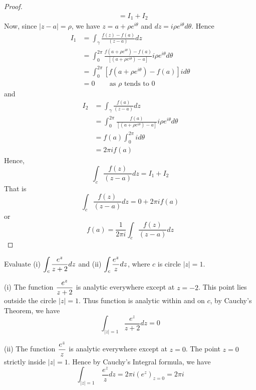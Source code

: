 \begin{proof}
\begin{align*}
																	&= I_1 + I_2
\end{align*}
Now, since $|z-a|=\rho$, we have $z=a+ \rho e^{i\theta}$ and $dz = i \rho e^{i\theta} d\theta$. Hence
\begin{align*}
 I_1 &= \int_{\gamma} \frac{f(z) - f(a)}{(z-a)} dz \\
 	 &= \int_{0}^{2\pi} \frac{f(a+ \rho e^{i\theta}) - f(a)}{[(a+ \rho e^{i\theta})-a]} i \rho e^{i\theta} d\theta \\
 	 &= \int_{0}^{2\pi} [f(a+ \rho e^{i\theta}) - f(a)] i d\theta \\
 	 &=0 ~~~~~~~~\text{ as } \rho \text{ tends to 0}
\end{align*}
and
\begin{align*}
 I_2 &= \int_{\gamma} \frac{f(a)}{(z-a)} dz \\
 	 &= \int_{0}^{2\pi} \frac{f(a)}{[(a+ \rho e^{i\theta})-a]} i \rho e^{i\theta} d\theta \\
 	 &= f(a) \int_{0}^{2\pi} i d\theta \\
 	 &= 2\pi i f(a)	 
 \end{align*}
Hence,
\[\int_{c} \frac{f(z)}{(z-a)} dz = I_1 + I_2\]
That is 
\[\int_{c} \frac{f(z)}{(z-a)} dz = 0 + 2 \pi i f(a) \]
or
\[ f(a) = \frac{1}{2 \pi i}\int_{c} \frac{f(z)}{(z-a)} dz \]
\end{proof}
\begin{example}
Evaluate (i) $\displaystyle \int_c \frac{e^z}{z+2}dz$ and (ii) $\displaystyle \int_c \frac{e^z}{z}dz$, where $c$ is circle $|z|=1$.
\end{example}
\begin{solution}
(i) The function $\displaystyle \frac{e^z}{z+2}$ is analytic everywhere except at $z=-2$. This point lies outside the circle $|z|=1$. Thus function is analytic within and on $c$, by Cauchy's Theorem, we have
\[\int_{|z|=1} \frac{e^z}{z+2}dz = 0\]

(ii)
The function $\displaystyle \frac{e^z}{z}$ is analytic everywhere except at $z=0$. The point $z=0$ strictly inside $|z|=1$. Hence by Cauchy's Integral formula, we have
\[\int_{|z|=1}~ \frac{e^z}{z}dz = 2 \pi i (e^z)_{z=0} =  2 \pi i \]
\end{solution}
